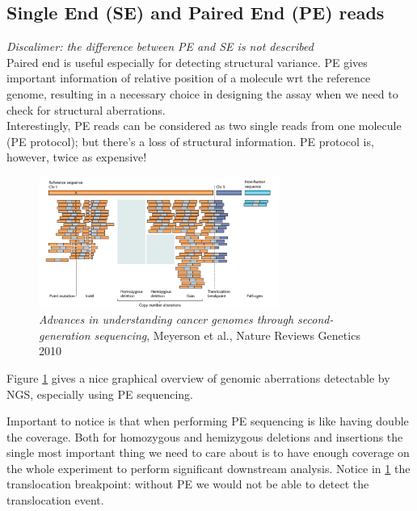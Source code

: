 \subsection{Single End (SE) and Paired End (PE) reads} \label{SE_PE}
\textit{Discalimer: the difference between PE and SE is not described}\\
Paired end is useful especially for detecting structural variance. PE gives important information of relative position of a molecule wrt the reference genome, resulting in a necessary choice in designing the assay when we need to check for structural aberrations. \\
Interestingly, PE reads can be considered as two single reads from one molecule (PE protocol); but there's a loss of structural information.
PE protocol is, however, twice as expensive!

\begin{figure}[H]
    \centering
    \includegraphics[width=0.7\textwidth]{igv.png}
    \caption{\textit{Advances in understanding cancer genomes through second-generation sequencing}, Meyerson et al., Nature Reviews Genetics 2010}
    \label{fig:igv}
\end{figure}

Figure \ref{fig:igv} gives a nice graphical overview of genomic aberrations detectable by NGS, especially using PE sequencing. 

Important to notice is that when performing PE sequencing is like having double the coverage. 
Both for homozygous and hemizygous deletions and insertions the single most important thing we need to care about is to have enough coverage on the whole experiment to perform significant downstream analysis. 
Notice in \ref{fig:igv} the translocation breakpoint: without PE we would not be able to detect the translocation event. 

 
















